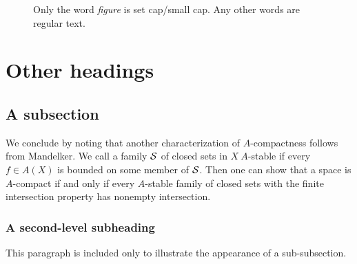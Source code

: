 
\begin{figure}[t]
\vskip 11.5pc
\caption{Only the word {\it figure} is set cap/small cap.  Any other words are
regular text.\label{firstfig}}
\end{figure}

\begin{figure}[t]
\vskip 7pc
\caption{\label{otherfig}}
\end{figure}


\section{Other headings}

\subsection{A subsection}  We conclude by noting that another characterization
of $A$-compactness follows from Mandelker. We call a family $\cal S$ of closed
sets in $X\ A$-stable if every $f\in A(X)$ is bounded on some member of $\cal
S$. Then one can show that a space is $A$-compact if and only if  every
$A$-stable family of closed sets with the finite intersection property has
nonempty intersection.

\subsubsection{A second-level subheading}

This paragraph is included only to illustrate the appearance of a
sub-subsection.




